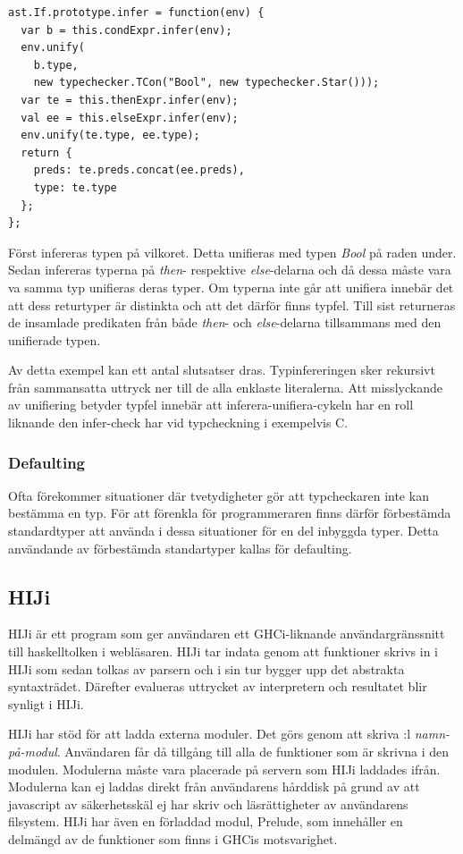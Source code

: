 \begin{lstlisting}
ast.If.prototype.infer = function(env) {
  var b = this.condExpr.infer(env);
  env.unify(
    b.type,
    new typechecker.TCon("Bool", new typechecker.Star()));
  var te = this.thenExpr.infer(env);
  val ee = this.elseExpr.infer(env);
  env.unify(te.type, ee.type);
  return {
    preds: te.preds.concat(ee.preds),
    type: te.type
  };
};
\end{lstlisting}
Först infereras typen på vilkoret. Detta unifieras med typen \emph{Bool} på raden under. Sedan infereras typerna på \emph{then}- respektive \emph{else}-delarna och då dessa måste vara va samma typ unifieras deras typer. Om typerna inte går att unifiera innebär det att dess returtyper är distinkta och att det därför finns typfel. Till sist returneras de insamlade predikaten från både \emph{then}- och \emph{else}-delarna tillsammans med den unifierade typen.

Av detta exempel kan ett antal slutsatser dras. Typinfereringen sker rekursivt från sammansatta uttryck ner till de alla enklaste literalerna. Att misslyckande av unifiering betyder typfel innebär att inferera-unifiera-cykeln har en roll liknande den infer-check har vid typcheckning i exempelvis C.

\subsubsection{Defaulting}
Ofta förekommer situationer där tvetydigheter gör att typcheckaren inte kan bestämma en typ. För att förenkla för programmeraren finns därför förbestämda standardtyper att använda i dessa situationer för en del inbyggda typer. Detta användande av förbestämda standartyper kallas för defaulting.

\subsection{HIJi}

HIJi är ett program som ger användaren ett GHCi-liknande användargränssnitt till haskelltolken i webläsaren. 
HIJi tar indata genom att funktioner skrivs in i HIJi som sedan tolkas av parsern och i sin tur bygger upp det abstrakta syntaxträdet. Därefter evalueras uttrycket av interpretern och resultatet blir synligt i HIJi.

HIJi har stöd för att ladda externa moduler. Det görs genom att skriva :l \emph{namn-på-modul}. Användaren får då tillgång till alla de funktioner som är skrivna i den modulen. Modulerna måste vara placerade på servern som HIJi laddades ifrån. Modulerna kan ej laddas direkt från användarens hårddisk på grund av att javascript av säkerhetsskäl ej har skriv och läsrättigheter av användarens filsystem. HIJi har även en förladdad modul, Prelude, som innehåller en delmängd av de funktioner som finns i GHCis motsvarighet. 

